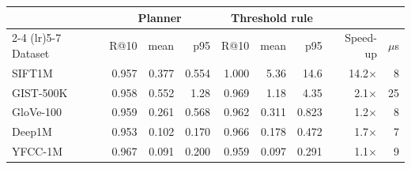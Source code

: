 \begin{tabular}{lrrrrrrrr}
\toprule
 & \multicolumn{3}{c}{Planner} & \multicolumn{3}{c}{Threshold rule} & & \\
\cmidrule(lr){2-4} \cmidrule(lr){5-7}
Dataset & R@10 & mean & p95 & R@10 & mean & p95 & Speed-up & $\mu$s \\
\midrule
SIFT1M & 0.957 & 0.377 & 0.554 & 1.000 & 5.36 & 14.6 & 14.2$\times$ & 8 \\
GIST-500K & 0.958 & 0.552 & 1.28 & 0.969 & 1.18 & 4.35 & 2.1$\times$ & 25 \\
GloVe-100 & 0.959 & 0.261 & 0.568 & 0.962 & 0.311 & 0.823 & 1.2$\times$ & 8 \\
Deep1M & 0.953 & 0.102 & 0.170 & 0.966 & 0.178 & 0.472 & 1.7$\times$ & 7 \\
YFCC-1M & 0.967 & 0.091 & 0.200 & 0.959 & 0.097 & 0.291 & 1.1$\times$ & 9 \\
\bottomrule
\end{tabular}
